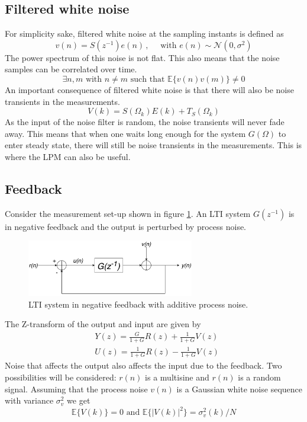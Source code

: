 \subsection{Filtered white noise}
For simplicity sake, filtered white noise at the sampling instants is defined as
\begin{equation*}
    v(n) = S(z^{-1}) e(n) \,,\quad \text{ with } e(n) \sim \mathcal{N}(0,\sigma^2)
\end{equation*}
The power spectrum of this noise is not flat. This also means that the noise samples can be correlated over time.
\begin{equation*}
    \exists n,m \text{ with } n \neq m \text{ such that } \mathbb{E}\{v(n) v(m)\} \neq 0 
\end{equation*}
An important consequence of filtered white noise is that there will also be noise transients in the measurements.
\begin{equation*}
    V(k) = S(\Omega_k) E(k) + T_S(\Omega_k)
\end{equation*}
As the input of the noise filter is random, the noise transients will never fade away. This means that when one waits long enough for the system $G(\Omega)$ to enter steady state, there will still be noise transients in the measurements. This is where the LPM can also be useful.

\subsection{Feedback}
\label{sec:feedback}
Consider the measurement set-up shown in figure \ref{fig:neg_feedback_system}. An LTI system $G(z^{-1})$ is in negative feedback and the output is perturbed by process noise.

\begin{figure}[H]
    \centering
    \includegraphics[width = 0.65\textwidth]{figures/system.pdf}
    \caption{LTI system in negative feedback with additive process noise.}
    \label{fig:neg_feedback_system}
\end{figure}

The Z-transform of the output and input are given by
\begin{align*}
    &Y(z) = \frac{G}{1+G} R(z) + \frac{1}{1+G} V(z)\\
    &U(z) = \frac{1}{1+G} R(z) - \frac{1}{1+G} V(z)
\end{align*}
Noise that affects the output also affects the input due to the feedback. Two possibilities will be considered: $r(n)$ is a multisine and $r(n)$ is a random signal. Assuming that the process noise $v(n)$ is a Gaussian white noise sequence with variance $\sigma_v^2$ we get
\begin{equation*}
    \mathbb{E}\{V(k)\} = 0 \text{ and } \mathbb{E}\{|V(k)|^2\} = \sigma_v^2(k)/N
\end{equation*}

